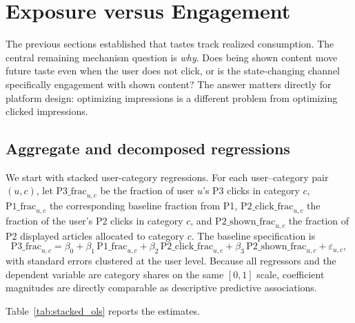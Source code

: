 \documentclass[11pt]{article}
\begin{document}
\section{Exposure versus Engagement}
\label{sec:exposure}

The previous sections established that tastes track realized consumption. The central remaining mechanism question is \emph{why}. Does being shown content move future taste even when the user does not click, or is the state-changing channel specifically engagement with shown content? The answer matters directly for platform design: optimizing impressions is a different problem from optimizing clicked impressions.

\subsection{Aggregate and decomposed regressions}

We start with stacked user-category regressions. For each user--category pair $(u,c)$, let $\text{P3\_frac}_{u,c}$ be the fraction of user $u$'s P3 clicks in category $c$, $\text{P1\_frac}_{u,c}$ the corresponding baseline fraction from P1, $\text{P2\_click\_frac}_{u,c}$ the fraction of the user's P2 clicks in category $c$, and $\text{P2\_shown\_frac}_{u,c}$ the fraction of P2 displayed articles allocated to category $c$. The baseline specification is
\[
\text{P3\_frac}_{u,c}
=
\beta_0
+
\beta_1\,\text{P1\_frac}_{u,c}
+
\beta_2\,\text{P2\_click\_frac}_{u,c}
+
\beta_3\,\text{P2\_shown\_frac}_{u,c}
+
\varepsilon_{u,c},
\]
with standard errors clustered at the user level. Because all regressors and the dependent variable are category shares on the same $[0,1]$ scale, coefficient magnitudes are directly comparable as descriptive predictive associations.

Table~\ref{tab:stacked_ols} reports the estimates.
\end{document}
